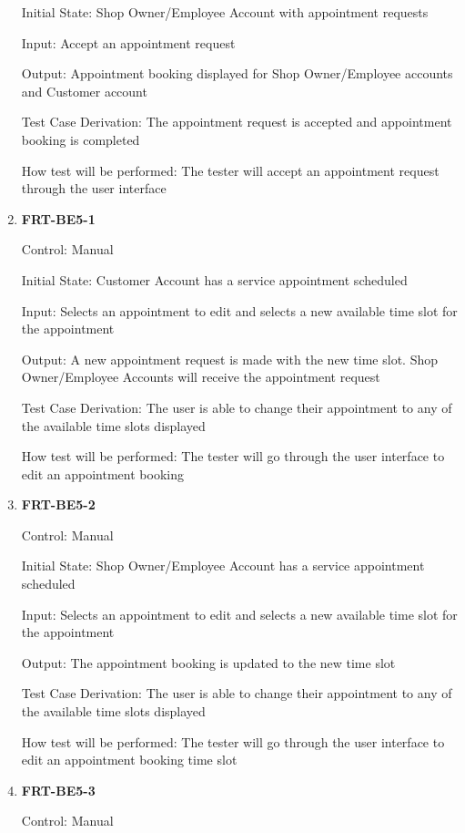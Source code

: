 \documentclass[12pt, titlepage]{article}
\begin{document}
\begin{enumerate}
	      Initial State: Shop Owner/Employee Account with appointment requests

	      Input: Accept an appointment request

	      Output: Appointment booking displayed for Shop Owner/Employee accounts and Customer account

	      Test Case Derivation: The appointment request is accepted and appointment booking is completed

	      How test will be performed: The tester will accept an appointment request through the user
	      interface

	\item \textbf{FRT-BE5-1}

	      Control: Manual

	      Initial State: Customer Account has a service appointment scheduled

	      Input: Selects an appointment to edit and selects a new available time slot for the appointment

	      Output: A new appointment request is made with the new time slot. Shop Owner/Employee Accounts will
	      receive the appointment request

	      Test Case Derivation: The user is able to change their appointment to any of the available time
	      slots displayed

	      How test will be performed: The tester will go through the user interface to edit an appointment
	      booking

	\item \textbf{FRT-BE5-2}

	      Control: Manual

	      Initial State: Shop Owner/Employee Account has a service appointment scheduled

	      Input: Selects an appointment to edit and selects a new available time slot for the appointment

	      Output: The appointment booking is updated to the new time slot

	      Test Case Derivation: The user is able to change their appointment to any of the available time
	      slots displayed

	      How test will be performed: The tester will go through the user interface to edit an appointment
	      booking time slot

	\item \textbf{FRT-BE5-3}

	      Control: Manual


\end{enumerate}
\end{document}
